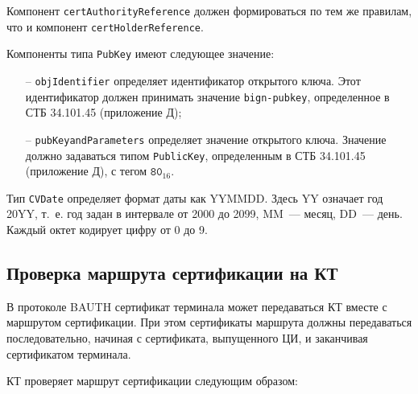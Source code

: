 Компонент \verb|certAuthorityReference| должен формироваться по тем же 
правилам, что и компонент \verb|certHolderReference|. 

Компоненты типа \verb|PubKey| имеют следующее значение:

\begin{itemize}
\item[--]
\verb|objIdentifier| определяет идентификатор открытого ключа. 
Этот идентификатор должен принимать значение \texttt{bign-pubkey}, 
определенное в СТБ 34.101.45 (приложение Д); 

\item[--]
\verb|pubKeyandParameters| определяет значение открытого ключа. 
Значение должно задаваться типом \verb|PublicKey|, 
определенным в СТБ 34.101.45 (приложение Д), с тегом $\texttt{80}_{16}$. 
\end{itemize}

Тип \verb|CVDate| определяет формат даты как YYMMDD. Здесь YY означает год 20YY, 
т.~е. год задан в интервале от 2000 до 2099, MM~--- месяц, DD~--- день. 
Каждый октет кодирует цифру от 0 до 9. 

\subsection{Проверка маршрута сертификации на КТ}\label{CERTS.Path}

В протоколе BAUTH сертификат терминала может передаваться КТ вместе с маршрутом 
сертификации. При этом сертификаты маршрута должны передаваться 
последовательно, начиная с сертификата, выпущенного ЦИ, и заканчивая 
сертификатом терминала.  

КТ проверяет маршрут сертификации следующим образом:

